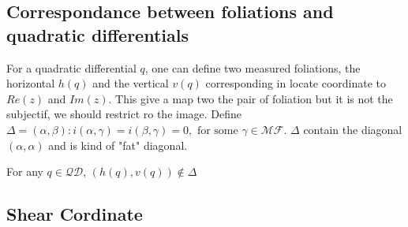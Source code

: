 \subsection{Correspondance between foliations and quadratic differentials}

For a quadratic differential $q$, one can define two measured foliations, the horizontal $h(q)$ and the vertical $v(q)$ corresponding in locate coordinate to $Re(z)$ and $Im(z)$. This give a map two the pair of foliation but it is not the subjectif, we should restrict ro the image.
Define $\Delta = {(\alpha,\beta):i(\alpha,\gamma)=i(\beta,\gamma)=0, \text{ for some }\gamma \in \mathcal{MF}}$. $\Delta$ contain the diagonal $(\alpha,\alpha)$ and is kind of "fat" diagonal.

\begin{lem}
For any $q \in \mathcal{QD}$, $(h(q),v(q)) \notin \Delta$
\end{lem}

\subsection{Shear Cordinate}
